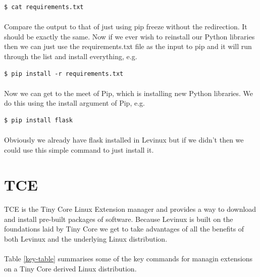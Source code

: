 \documentclass[12pt, a4paper, twoside]{book}
\begin{document}
\begin{lstlisting}[style=DOS]
    $ cat requirements.txt
\end{lstlisting}

\paragraph{} Compare the output to that of just using pip freeze without the redirection. It should be exactly the same. Now if we ever wish to reinstall our Python libraries then we can just use the requirements.txt file as the input to pip and it will run through the list and install everything, e.g.

\begin{lstlisting}[style=DOS]
    $ pip install -r requirements.txt
\end{lstlisting}

\paragraph{} Now we can get to the meet of Pip, which is installing new Python libraries. We do this using the install argument of Pip, e.g.

\begin{lstlisting}[style=DOS]
    $ pip install flask
\end{lstlisting}

\paragraph{} Obviously we already have flask installed in Levinux but if we didn't then we could use this simple command to just install it. 

\section{TCE}
\label{tce}
\paragraph{} TCE is the Tiny Core Linux Extension manager and provides a way to download and install pre-built packages of software. Because Levinux is built on the foundations laid by Tiny Core we get to take advantages of all the benefits of both Levinux and the underlying Linux distribution.

\paragraph{} Table \ref{key-table} summarises some of the key commands for managin extensions on a Tiny Core derived Linux distribution.
\end{document}
